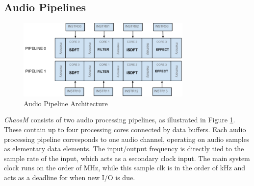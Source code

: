 \FloatBarrier
\subsection{Audio Pipelines}\label{subsec:audio_pipelines}

\begin{figure}[H]
    \centering
    \includegraphics[height=150px]{figures/fpga/system_components_general_pipeline.png}
    \caption{Audio Pipeline Architecture}
    \label{fig:pipeline_architecture}
\end{figure}

\textit{ChaosM} consists of two audio processing pipelines, as illustrated in
Figure \ref{fig:pipeline_architecture}. These contain up to four processing cores
connected by data buffers. Each audio processing pipeline corresponds to one audio channel, operating on audio samples as elementary data elements.
The input/output frequency is directly tied to the sample rate of the input, which acts as a secondary clock input. The main system clock runs on the order of MHz, while this sample clk is in the order of kHz and acts as a deadline for when new I/O is due.
